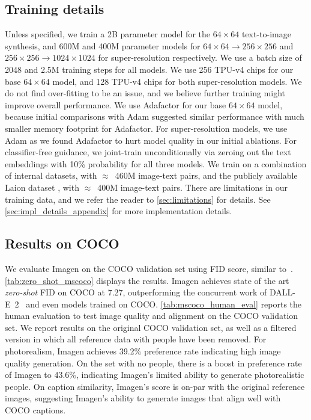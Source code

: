 \subsection{Training details}

\label{sec:experiments_trainingdetails}
Unless specified, we train a 2B parameter model for the $64\times64$ text-to-image synthesis, and 600M and 400M parameter models for $64\times64 \rightarrow 256\times256$ and $256\times256 \rightarrow 1024\times1024$ for super-resolution respectively. We use a batch size of 2048 and 2.5M training steps for all models. We use 256 TPU-v4 chips for our base $64\times64$ model, and 128 TPU-v4 chips for both super-resolution models. We do not find over-fitting to be an issue, and we believe further training might improve overall performance. We use Adafactor for our base $64\times64$ model, because initial comparisons with Adam suggested similar performance with much smaller memory footprint for Adafactor. For super-resolution models, we use Adam as we found Adafactor to hurt model quality in our initial ablations. For classifier-free guidance, we joint-train unconditionally via zeroing out the text embeddings with 10\% probability for all three models. We train on a combination of internal datasets, with $\approx$~460M image-text pairs, and the publicly available Laion dataset \cite{schuhmann2021laion}, with $\approx$~400M image-text pairs. There are limitations in our training data, and we refer the reader to \ref{sec:limitations} for details. See \ref{sec:impl_details_appendix} for more implementation details.

\subsection{Results on COCO}
\label{sec:experiments_mscoco}

\label{sec:zero_shot_mscoco}
We evaluate Imagen on the COCO validation set using FID score, similar to~\citep{ramesh-dalle, nichol-glide}.
\ref{tab:zero_shot_mscoco} displays the results. Imagen achieves state of the art \emph{zero-shot} FID on COCO at 7.27,  outperforming the concurrent work of DALL-E~2~\cite{ramesh-dalle2} and even models trained on COCO.
\ref{tab:mscoco_human_eval} reports the human evaluation to test image quality and alignment on the COCO validation set. We report results on the original COCO validation set, as well as a filtered version in which all reference data with people have been removed. For photorealism, Imagen achieves 39.2\% preference rate indicating high image quality  generation.  On the set with no people, there is a boost in preference rate of Imagen to 43.6\%,  indicating Imagen's limited ability to generate photorealistic people. On caption similarity, Imagen's score is on-par with the original reference images, suggesting Imagen's ability to generate images that align well with COCO captions.


